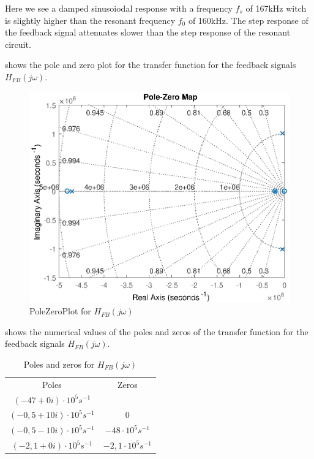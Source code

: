 Here we see a damped sinusoiodal response with a frequency $f_s$ of 167kHz witch is slightly higher than the resonant frequency $f_0$ of 160kHz. The step response of the feedback signal attenuates slower than the step response of the resonant circuit.

 shows the pole and zero plot for the transfer function for the feedback signals $H_{FB}(j\omega)$.

\begin{figure}[H]
    \centering
    \includegraphics[width=\textwidth]{img/FeedBackPoleZeroPlot.eps}
    \caption{PoleZeroPlot for $H_{FB}(j\omega)$}
    \label{fig:fbpolezero}
\end{figure}

 shows the numerical values of the poles and zeros of the transfer function for the feedback signals $H_{FB}(j\omega)$.

\begin{table}[h]
    \centering
    \begin{tabular}{c|c}
        Poles & Zeros \\
        $(-47 + 0i)\cdot 10^{5} s^{-1}$ & \\
        $(-0,5 + 10i)\cdot 10^{5} s^{-1}$ & $0$ \\
        $(-0,5 - 10i)\cdot 10^{5} s^{-1}$ & $-48\cdot 10^{5} s^{-1}$ \\
        $(-2,1 + 0i)\cdot 10^{5} s^{-1}$ & $-2,1\cdot 10^{5} s^{-1}$ \\
    \end{tabular}
    \caption{Poles and zeros for $H_{FB}(j\omega)$}
    \label{tab:fbcoilrigpoles}
\end{table}

